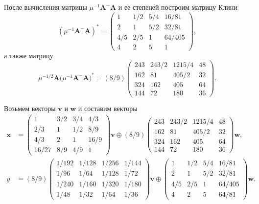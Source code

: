 \documentclass[specialist,
               substylefile = spbu.rtx,
               subf,href,colorlinks=true, 12pt]{disser}
\theoremstyle{definition}
\begin{document}
После вычисления матрицы $\mu^{-1}\bm{A}^{-}\bm{A}$ и ее степеней построим матрицу Клини 
\begin{equation*}
(\mu^{-1}\bm{A}^{-}\bm{A})^{\ast}
=
\left(
\begin{array}{cccc}
1 & 1/2 & 5/4 & 16/81
\\
2 & 1 & 5/2 & 32/81
\\
4/5 & 2/5 & 1 & 64/405
\\
4 & 2 & 5 & 1
\end{array}
\right),
\end{equation*}
а также матрицу
\begin{equation*}
\mu^{-1/2}\bm{A}\bm(\mu^{-1}\bm{A}^{-}\bm{A})^{\ast}
=
(8/9)
\left(
\begin{array}{cccc}
243 & 243/2 & 1215/4 & 48
\\
162 & 81 & 405/2 & 32
\\
324 & 162 & 405 & 64
\\
144 & 72 & 180 & 36
\end{array}
\right).
\end{equation*}


Возьмем векторы $\bm{v}$ и $\bm{w}$ и составим векторы
\begin{align*}
\bm{x}
&=
\left(
\begin{array}{cccc}
1 & 3/2 & 3/4 & 4/3
\\
2/3 & 1 & 1/2 & 8/9
\\
4/3 & 2 & 1 & 16/9
\\
16/27 & 8/9 & 4/9 & 1
\end{array}
\right)
\bm{v}
\oplus
(8/9)
\left(
\begin{array}{cccc}
243 & 243/2 & 1215/4 & 48
\\
162 & 81 & 405/2 & 32
\\
324 & 162 & 405 & 64
\\
144 & 72 & 180 & 36
\end{array}
\right)
\bm{w},
\\
y
&=
(8/9)
\left(
\begin{array}{cccc}
1/192 & 1/128 & 1/256 & 1/144
\\
1/96 & 1/64 & 1/128 & 1/72
\\
1/240 & 1/160 & 1/320 & 1/180
\\
1/48 & 1/32 & 1/64 & 1/36
\end{array}
\right)
\bm{v}
\oplus
\left(
\begin{array}{cccc}
1 & 1/2 & 5/4 & 16/81
\\
2 & 1 & 5/2 & 32/81
\\
4/5 & 2/5 & 1 & 64/405
\\
4 & 2 & 5 & 64/81
\end{array}
\right)
\bm{w}.
\end{align*}
\end{document}
